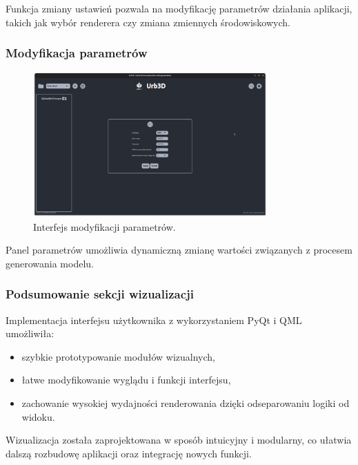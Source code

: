 Funkcja zmiany ustawień pozwala na modyfikację parametrów działania aplikacji, takich jak wybór renderera czy zmiana zmiennych środowiskowych.

\subsubsection{Modyfikacja parametrów}
\begin{figure}[h!]
    \centering
    \includegraphics[width=0.8\textwidth]{img/wizualizacja/ui_parametry.png}
    \caption{Interfejs modyfikacji parametrów.}
\end{figure}

Panel parametrów umożliwia dynamiczną zmianę wartości związanych z procesem generowania modelu.

\subsubsection{Podsumowanie sekcji wizualizacji}

Implementacja interfejsu użytkownika z wykorzystaniem PyQt i QML umożliwiła:
\begin{itemize}
    \item szybkie prototypowanie modułów wizualnych,
    \item łatwe modyfikowanie wyglądu i funkcji interfejsu,
    \item zachowanie wysokiej wydajności renderowania dzięki odseparowaniu logiki od widoku.
\end{itemize}

Wizualizacja została zaprojektowana w sposób intuicyjny i modularny, co ułatwia dalszą rozbudowę aplikacji oraz integrację nowych funkcji.
